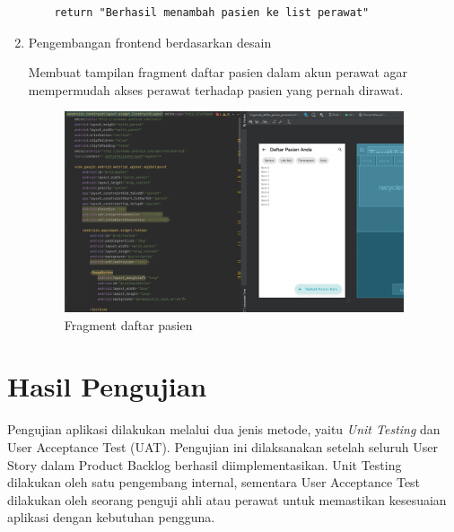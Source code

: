 \begin{enumerate}
\begin{lstlisting}
    return "Berhasil menambah pasien ke list perawat"
\end{lstlisting}
\item Pengembangan frontend berdasarkan desain

Membuat tampilan fragment daftar pasien dalam akun perawat agar mempermudah akses perawat terhadap pasien yang pernah dirawat.
	\begin{figure}[H]
		\centering
		\includegraphics[keepaspectratio, width=10cm]{gambar/fragment_daftar_pasien}
		\caption{Fragment daftar pasien}
		\label{gambar:fragment_daftar_pasien}
	\end{figure}

\end{enumerate}
\section{Hasil Pengujian}
Pengujian aplikasi dilakukan melalui dua jenis metode, yaitu \textit{Unit Testing} dan User Acceptance Test (UAT). Pengujian ini dilaksanakan setelah seluruh User Story dalam Product Backlog berhasil diimplementasikan. Unit Testing dilakukan oleh satu pengembang internal, sementara User Acceptance Test dilakukan oleh seorang penguji ahli atau perawat untuk memastikan kesesuaian aplikasi dengan kebutuhan pengguna.

